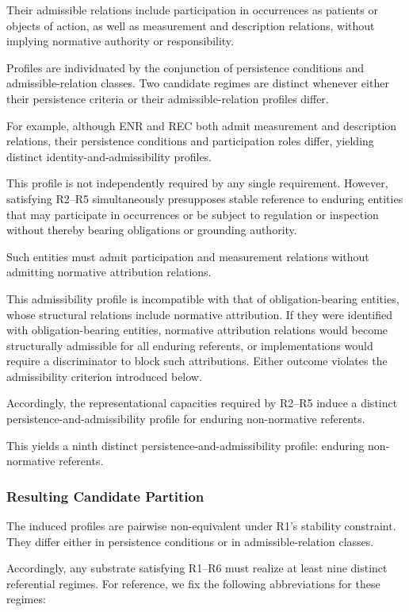 Their admissible relations include
participation in occurrences as patients or objects of action,
as well as measurement and description relations,
without implying normative authority or responsibility.

Profiles are individuated by the conjunction of
persistence conditions and admissible-relation classes.
Two candidate regimes are distinct whenever either their
persistence criteria or their admissible-relation profiles differ.

For example, although ENR and REC both admit measurement and description relations,
their persistence conditions and participation roles differ,
yielding distinct identity-and-admissibility profiles.

This profile is not independently required by any single requirement.
However, satisfying R2--R5 simultaneously presupposes
stable reference to enduring entities that may participate
in occurrences or be subject to regulation or inspection
without thereby bearing obligations or grounding authority.

Such entities must admit participation and measurement relations
without admitting normative attribution relations.

This admissibility profile is incompatible with that of
obligation-bearing entities, whose structural relations
include normative attribution.
If they were identified with obligation-bearing entities,
normative attribution relations would become structurally admissible
for all enduring referents, or implementations would require
a discriminator to block such attributions.
Either outcome violates the admissibility criterion introduced below.

Accordingly, the representational capacities required by R2--R5
induce a distinct persistence-and-admissibility profile
for enduring non-normative referents.

This yields a ninth distinct persistence-and-admissibility profile:
enduring non-normative referents.

\subsubsection{Resulting Candidate Partition}

The induced profiles are pairwise non-equivalent under R1's stability constraint.
They differ either in persistence conditions or in admissible-relation classes.

Accordingly, any substrate satisfying R1--R6
must realize at least nine distinct referential regimes.
For reference, we fix the following abbreviations
for these regimes:

